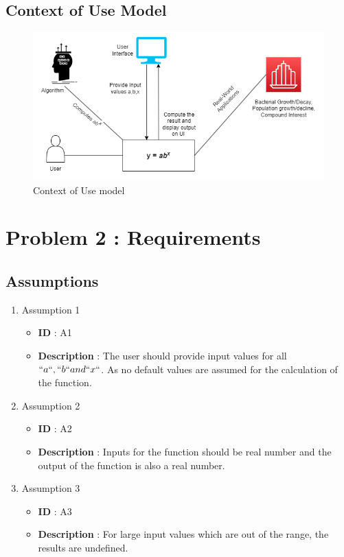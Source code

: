 \documentclass[12pt, a4paper]{article}
\begin{document}
\subsection{Context of Use Model}
\begin{figure}[h!]
  \includegraphics[width=\linewidth]{ContextOfUse.png}
  \caption{Context of Use model}
  \label{fig:Context of Use model}
\end{figure}


\newpage

\section{Problem 2 : Requirements}
\subsection{Assumptions}
\begin{enumerate}
    \item{} Assumption 1
     \begin{itemize}
        \item \textbf{ID} : A1
        \item \textbf{Description} : The user should provide input values for all $``a``,``b`` and ``x``$. As  no default values are assumed for the calculation of the function.
     \end{itemize}
     
     \item{} Assumption 2
     \begin{itemize}
        \item \textbf{ID} : A2
        \item \textbf{Description} : Inputs for the function should be real number and the output of the function is also a real number.
     \end{itemize}
    
     \item{} Assumption 3
     \begin{itemize}
        \item \textbf{ID} : A3
        \item \textbf{Description} : For large input values which are out of the range, the results are undefined.
     \end{itemize}
    
\end{enumerate}
\end{document}
